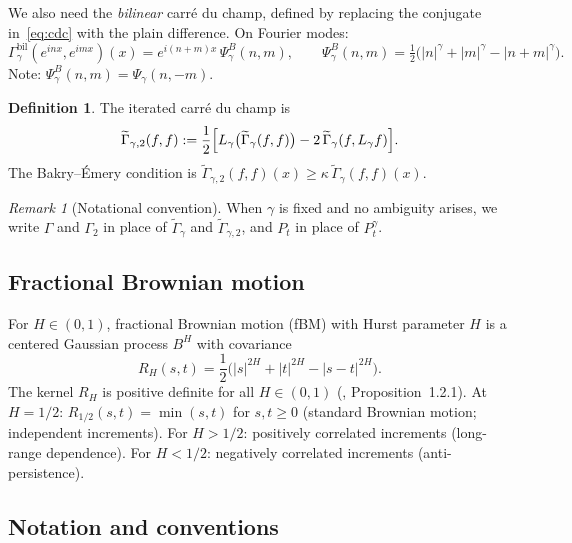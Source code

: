 \documentclass[11pt,a4paper]{article}
\theoremstyle{plain}
\theoremstyle{definition}
\newtheorem{definition}[theorem]{Definition}
\theoremstyle{remark}
\newtheorem{remark}[theorem]{Remark}
\begin{document}
We also need the \emph{bilinear} carr\'e du champ, defined by replacing
the conjugate in~\eqref{eq:cdc} with the plain difference. On Fourier modes:
\begin{equation}\label{eq:psi-bilinear}
  \Gamma_\gamma^{\mathrm{bil}}(e^{inx}, e^{imx})(x)
  = e^{i(n+m)x}\,\Psi_\gamma^B(n,m),
  \qquad
  \Psi_\gamma^B(n,m) = \tfrac{1}{2}\bigl(|n|^\gamma + |m|^\gamma
  - |n+m|^\gamma\bigr).
\end{equation}
Note: $\Psi_\gamma^B(n,m) = \Psi_\gamma(n,-m)$.

\begin{definition}\label{def:gamma2}
The iterated carr\'e du champ is
\begin{equation}\label{eq:gamma2-def}
  \widetilde{\Gamma}_{\gamma,2}(f,f)
  := \frac{1}{2}\Bigl[
    L_\gamma\bigl(\widetilde{\Gamma}_\gamma(f,f)\bigr)
    - 2\,\widetilde{\Gamma}_\gamma(f, L_\gamma f)
  \Bigr].
\end{equation}
The Bakry--\'Emery condition is
$\widetilde{\Gamma}_{\gamma,2}(f,f)(x) \geq \kappa\,
\widetilde{\Gamma}_\gamma(f,f)(x)$.
\end{definition}

\begin{remark}[Notational convention]\label{rem:tilde}
When $\gamma$ is fixed and no ambiguity arises, we write $\Gamma$
and $\Gamma_2$ in place of $\widetilde{\Gamma}_\gamma$ and
$\widetilde{\Gamma}_{\gamma,2}$, and $P_t$ in place of
$P_t^\gamma$.
\end{remark}


\subsection{Fractional Brownian motion}

For $H \in (0,1)$, fractional Brownian motion (fBM) with Hurst
parameter $H$ is a centered Gaussian process $B^H$ with covariance
\begin{equation}\label{eq:fbm-cov}
  R_H(s,t)
  = \frac{1}{2}\bigl(|s|^{2H} + |t|^{2H} - |s-t|^{2H}\bigr).
\end{equation}
The kernel $R_H$ is positive definite for all $H \in (0,1)$
(\cite{Mishura2008}, Proposition~1.2.1).
At $H = 1/2$: $R_{1/2}(s,t) = \min(s,t)$ for $s,t \geq 0$
(standard Brownian motion; independent increments).
For $H > 1/2$: positively correlated increments (long-range dependence).
For $H < 1/2$: negatively correlated increments (anti-persistence).


\subsection{Notation and conventions}\label{sec:notation}
\end{document}
